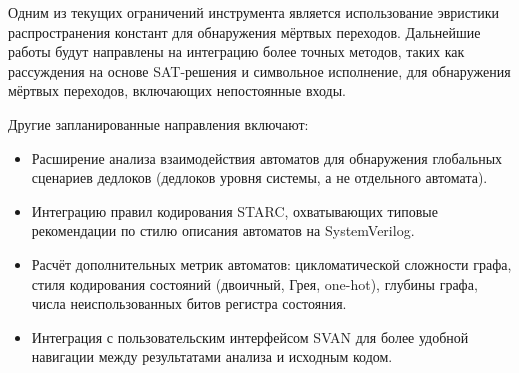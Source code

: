 Одним из текущих ограничений инструмента является использование эвристики распространения констант для
обнаружения мёртвых переходов. Дальнейшие работы будут направлены на интеграцию более точных методов, таких
как рассуждения на основе SAT-решения и символьное исполнение, для обнаружения мёртвых переходов,
включающих непостоянные входы.

Другие запланированные направления включают:

\begin{itemize}
\item Расширение анализа взаимодействия автоматов для обнаружения глобальных сценариев дедлоков (дедлоков
уровня системы, а не отдельного автомата).

\item Интеграцию правил кодирования STARC, охватывающих типовые рекомендации по стилю описания автоматов на
SystemVerilog.

\item Расчёт дополнительных метрик автоматов: цикломатической сложности графа, стиля кодирования состояний
(двоичный, Грея, one-hot), глубины графа, числа неиспользованных битов регистра состояния.

\item Интеграция с пользовательским интерфейсом SVAN для более удобной навигации между результатами анализа
и исходным кодом.
\end{itemize}

